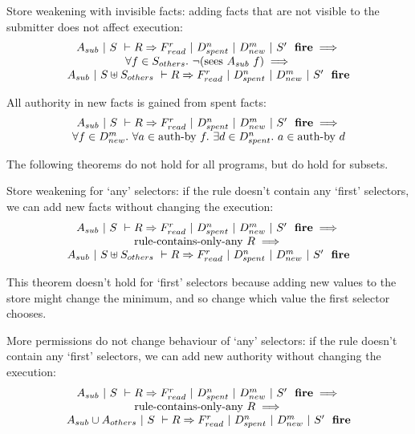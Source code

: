 \begin{theorem}
Store weakening with invisible facts: adding facts that are not visible to the submitter does not affect execution:
$$
\begin{array}{c}
A_{sub}~|~S~\vdash R \Rightarrow F_{read}^r~|~D_{spent}^n~|~D_{new}^m~|~S'~~\textbf{fire}
\implies \\
\forall f \in S_{others}.\ \neg (\textrm{sees}~ A_{sub}~ f)
\implies \\
A_{sub}~|~S \uplus S_{others}~\vdash R \Rightarrow F_{read}^r~|~D_{spent}^n~|~D_{new}^m~|~S'~~\textbf{fire}
\end{array}
$$
\end{theorem}

\begin{theorem}
All authority in new facts is gained from spent facts:
$$
\begin{array}{c}
A_{sub}~|~S~\vdash R \Rightarrow F_{read}^r~|~D_{spent}^n~|~D_{new}^m~|~S'~~\textbf{fire}
\implies \\
\forall f \in D_{new}^m.\ \forall a \in \textrm{auth-by}~f.\ \exists d \in D_{spent}^n.\ a \in \textrm{auth-by}~d
\end{array}
$$
\end{theorem}

The following theorems do not hold for all programs, but do hold for subsets.

\begin{theorem}
Store weakening for `any' selectors: if the rule doesn't contain any `first' selectors, we can add new facts without changing the execution:
$$
\begin{array}{c}
A_{sub}~|~S~\vdash R \Rightarrow F_{read}^r~|~D_{spent}^n~|~D_{new}^m~|~S'~~\textbf{fire}
\implies \\
\textrm{rule-contains-only-any}~R \implies \\
A_{sub}~|~S \uplus S_{others}~\vdash R \Rightarrow F_{read}^r~|~D_{spent}^n~|~D_{new}^m~|~S'~~\textbf{fire}
\end{array}
$$
\end{theorem}

This theorem doesn't hold for `first' selectors because adding new values to the store might change the minimum, and so change which value the first selector chooses.

\begin{theorem}
More permissions do not change behaviour of `any' selectors: if the rule doesn't contain any `first' selectors, we can add new authority without changing the execution:
$$
\begin{array}{c}
A_{sub}~|~S~\vdash R \Rightarrow F_{read}^r~|~D_{spent}^n~|~D_{new}^m~|~S'~~\textbf{fire}
\implies \\
\textrm{rule-contains-only-any}~R \implies \\
A_{sub} \cup A_{others}~|~S~\vdash R \Rightarrow F_{read}^r~|~D_{spent}^n~|~D_{new}^m~|~S'~~\textbf{fire}
\end{array}
$$
\end{theorem}

